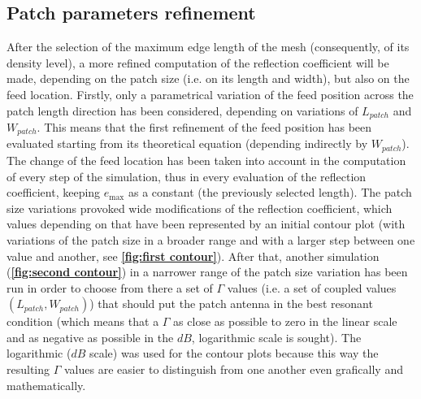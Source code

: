 \documentclass[12pt,a4paper]{article}
\begin{document}
{\subsection*{Patch parameters refinement}
After the selection of the maximum edge length of the mesh (consequently, of its density level), a more refined computation of the reflection coefficient will be made, depending on the patch size (i.e. on its length and width), but also on the feed location. Firstly, only a parametrical variation of the feed position across the patch length direction has been considered, depending on variations of $L_{patch}$ and $W_{patch}$. This means that the first refinement of the feed position has been evaluated starting from its theoretical equation (depending indirectly by $W_{patch}$). The change of the feed location has been taken into account in the computation of every step of the simulation, thus in every evaluation of the reflection coefficient, keeping $e_{\max}$ as a constant (the previously selected length). The patch size variations provoked wide modifications of the reflection coefficient, which values depending on that have been represented by an initial contour plot (with variations of the patch size in a broader range and with a larger step between one value and another, see \textbf{\cref{fig:first contour}}). After that, another simulation (\textbf{\cref{fig:second contour}}) in a narrower range of the patch size variation has been run in order to choose from there a set of $\Gamma$ values (i.e. a set of coupled values $(L_{patch},W_{patch})$) that should put the patch antenna in the best resonant condition (which means that a $\Gamma$ as close as possible to zero in the linear scale and as negative as possible in the $dB$, logarithmic scale is sought). The logarithmic ($dB$ scale) was used for the contour plots because this way the resulting $\Gamma$ values are easier to distinguish from one another even grafically and mathematically. 
}
\end{document}
